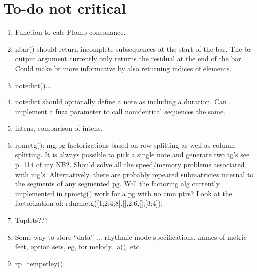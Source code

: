 \documentclass[12pt,letterpaper,titlepage]{article}
\newcommand{\dq}[1]{``#1''}
\begin{document}
\section{To-do not critical}
\begin{enumerate}
\item Function to calc Plomp consonance.  
\item nbar() should return incomplete subsequences at the start of the bar.  The br output argument currently only returns the residual at the end of the bar.  Could make br more informative by also returning indices of elements.  
\item notedict()...
\item notedict should optionally define a note as including a duration.  Can implement a fuzz parameter to call nonidentical sequences the same.  
\item intcns, comparison of intcns.  
\item rpmetg():  mg.pg factorizations based on row splitting as well as column splitting.  It is always possible to pick a single note and generate two tg's see p. 114 of my NB2.  Should solve all the speed/memory problems associated with mg's.  Alternatively, there are probably repeated submatricies internal to the segments of any segmented pg.  Will the factoring alg currently implemented in rpmetg() work for a pg with no cmn ptrs?  Look at the factorization of: rdurmetg([1;2;4;8],[],2,6,[],[3;4]);
\item Tuplets???
\item Some way to store \dq{data} ... rhythmic mode specifications, names of metric feet, option sets, eg, for melody\_a(), etc.  
\item rp\_temperley().  
\end{enumerate}
\end{document}
